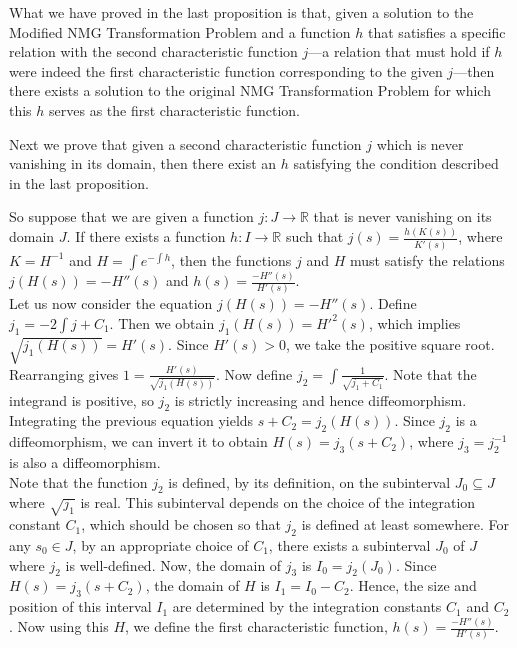 \documentclass[12pt]{article}
\theoremstyle{plain}
\theoremstyle{definition}
\theoremstyle{remark}
\begin{document}
 
 What we have proved in the last proposition is that, given a solution to the Modified NMG Transformation Problem and a function \(h\) that satisfies a specific relation with the second characteristic function \(j\)—a relation that must hold if \(h\) were indeed the first characteristic function corresponding to the given  \(j\)—then there exists a solution to the original NMG Transformation Problem for which this \(h\) serves as the first characteristic function. 
 
 Next we prove that given a second characteristic function \(j\) which is never vanishing in its domain, then there exist an \(h\) satisfying the condition described in the last proposition.
 
 So suppose that we are given a function \(j: J \longrightarrow \mathbb{R}\) that is never vanishing on its domain \(J\). If there exists a function \(h: I \longrightarrow \mathbb{R}\) such that \(j(s) = \frac{h(K(s))}{K'(s)}\), where \(K = H^{-1}\) and \(H = \int e^{-\int h}\), then the functions \(j\) and \(H\) must satisfy the relations \(j(H(s)) = -H''(s)\) and \(h(s) = \frac{-H''(s)}{H'(s)}\).\\
 
 Let us now consider the equation \(j(H(s)) = -H''(s)\). Define \(j_1 = -2\int j+C_1\). Then we obtain \(j_1(H(s))= {H'}^2(s)\), which implies \(\sqrt{j_1(H(s))} = H'(s)\). Since \(H'(s) > 0\), we take the positive square root. Rearranging gives \(1 = \frac{H'(s)}{\sqrt{j_1(H(s))}}\). Now define \(j_2 = \int \frac{1}{\sqrt{j_1 + C_1}}\). Note that the integrand is positive, so \(j_2\) is strictly increasing and hence diffeomorphism. Integrating the previous equation yields \(s + C_2 = j_2(H(s))\). Since \(j_2\) is a diffeomorphism, we can invert it to obtain \(H(s) = j_3(s + C_2)\), where \(j_3 = j_2^{-1}\) is also a diffeomorphism.\\
 
Note that the function \(j_2\) is defined, by its definition, on the subinterval \(J_0 \subseteq J\) where \(\sqrt{j_1}\) is real. This subinterval depends on the choice of the integration constant \(C_1\), which should be chosen so that \(j_2\) is defined at least somewhere. For any \(s_0 \in J\), by an appropriate choice of \(C_1\), there exists a subinterval \(J_0\) of \(J\) where \(j_2\) is well-defined. Now, the domain of \(j_3\) is \(I_0 = j_2(J_0)\). Since \(H(s) = j_3(s + C_2)\), the domain of \(H\) is \(I_1 = I_0 - C_2\). Hence, the size and position of this interval \(I_1\) are determined by the integration constants \(C_1\) and \(C_2\).  Now using this \(H\), we define the first characteristic function, \(h(s)=\frac{-H''(s)}{H'(s)}\). \\
\end{document}
